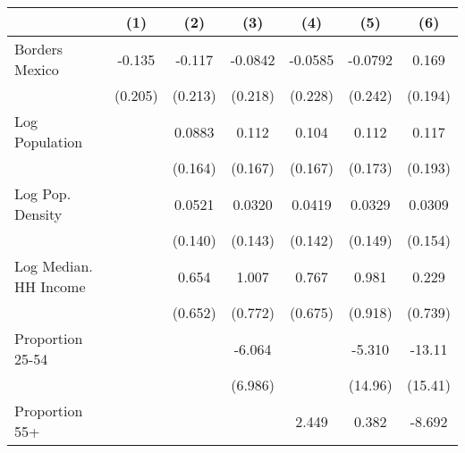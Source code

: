 {
\def\sym#1{\ifmmode^{#1}\else\(^{#1}\)\fi}
\begin{tabular}{l*{6}{c}}
\toprule
                    &\multicolumn{1}{c}{(1)}         &\multicolumn{1}{c}{(2)}         &\multicolumn{1}{c}{(3)}         &\multicolumn{1}{c}{(4)}         &\multicolumn{1}{c}{(5)}         &\multicolumn{1}{c}{(6)}         \\
\midrule
Borders Mexico      &      -0.135         &      -0.117         &     -0.0842         &     -0.0585         &     -0.0792         &       0.169         \\
                    &     (0.205)         &     (0.213)         &     (0.218)         &     (0.228)         &     (0.242)         &     (0.194)         \\
\addlinespace
Log Population      &                     &      0.0883         &       0.112         &       0.104         &       0.112         &       0.117         \\
                    &                     &     (0.164)         &     (0.167)         &     (0.167)         &     (0.173)         &     (0.193)         \\
\addlinespace
Log Pop. Density    &                     &      0.0521         &      0.0320         &      0.0419         &      0.0329         &      0.0309         \\
                    &                     &     (0.140)         &     (0.143)         &     (0.142)         &     (0.149)         &     (0.154)         \\
\addlinespace
Log Median. HH Income&                     &       0.654         &       1.007         &       0.767         &       0.981         &       0.229         \\
                    &                     &     (0.652)         &     (0.772)         &     (0.675)         &     (0.918)         &     (0.739)         \\
\addlinespace
Proportion 25-54    &                     &                     &      -6.064         &                     &      -5.310         &      -13.11         \\
                    &                     &                     &     (6.986)         &                     &     (14.96)         &     (15.41)         \\
\addlinespace
Proportion 55+      &                     &                     &                     &       2.449         &       0.382         &      -8.692         \\

\end{tabular}}
